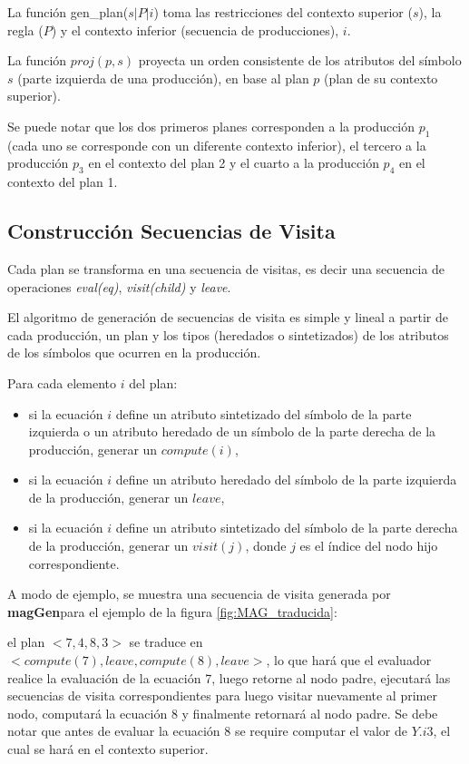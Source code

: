 \documentclass[a4paper]{article}
\newcommand{\maggen}{\textbf{magGen}}
\begin{document}
La función gen\_plan($s | P | i$) toma las restricciones del contexto superior 
($s$), la regla ($P$) y el contexto inferior (secuencia de producciones), $i$.

La función $proj(p,s)$ proyecta un orden consistente de los atributos del símbolo $s$ (parte
izquierda de una producción), en base al plan $p$ (plan de su contexto superior).

Se puede notar que los dos primeros planes corresponden a la producción $p_1$ (cada uno
se corresponde con un diferente contexto inferior), el tercero a la producción $p_3$
en el contexto del plan 2 y el cuarto a la producción $p_4$ en el contexto del plan 1.

\subsection{Construcción Secuencias de Visita}
\label{seubsec:seq-visit}
\vspace{-0.22cm}

Cada plan se transforma en una secuencia de visitas, es decir una secuencia de operaciones
\emph{eval(eq)}, \emph{visit(child)} y \emph{leave}.

El algoritmo de generación de secuencias de visita es simple y lineal a partir de cada producción, un plan y los tipos (heredados o sintetizados) de los atributos de los símbolos
que ocurren en la producción.

Para cada elemento $i$ del plan:
\begin{itemize}
\item si la ecuación $i$ define un atributo sintetizado del símbolo de la parte izquierda o un
atributo heredado de un símbolo de la parte derecha de la producción, 
generar un $compute(i)$,
\item si la ecuación $i$ define un atributo heredado del símbolo de la parte izquierda de la
producción, generar un $leave$,
\item si la ecuación $i$ define un atributo sintetizado del símbolo de la parte derecha de 
la producción, generar un $visit(j)$, donde $j$ es el índice del nodo hijo correspondiente.
\end{itemize}

A modo de ejemplo, se muestra una secuencia de visita generada por \maggen para el ejemplo 
de la figura \ref{fig:MAG_traducida}:

el plan $<7,4,8,3>$ se traduce en $<compute(7),leave,compute(8),leave>$, lo que hará que el 
evaluador realice la evaluación de la ecuación 7, luego retorne al nodo padre, ejecutará las
secuencias de visita correspondientes para luego visitar nuevamente al primer nodo, computará
la ecuación 8 y finalmente retornará al nodo padre. Se debe notar que antes de evaluar la ecuación 8 se require computar el valor de $Y.i3$, el cual se hará en el contexto superior. \\
\end{document}

